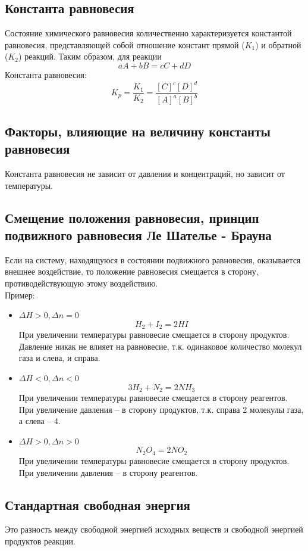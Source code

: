 \documentclass[14pt,a4paper]{scrartcl}
\begin{document}
\subsection*{Константа равновесия}
Состояние химического равновесия количественно характеризуется константой равновесия, представляющей собой отношение констант прямой ($K_1$) и обратной ($K_2$) реакций. Таким образом, для реакции
$$ aA + bB = cC +  dD $$
Константа равновесия:
$$ K_p = \frac{K_1}{K_2} = \dfrac{\left[ C\right]^c \left[ D\right]^d }{\left[ A\right]^a \left[ B\right]^b} $$
\subsection*{Факторы, влияющие на величину константы равновесия}
Константа равновесия не зависит от давления и концентраций, но зависит от температуры.
\subsection*{Смещение положения равновесия, принцип подвижного равновесия Ле Шателье - Брауна}
Если на систему, находящуюся в состоянии подвижного равновесия, оказывается внешнее воздействие, то положение равновесия смещается в сторону, противодействующую этому воздействию. \\
Пример: \\
\begin{itemize}
	\item $ \Delta{H} > 0, \Delta{n} = 0 $ 
	$$ H_2 + I_2 = 2HI $$
	При увеличении температуры равновесие смещается в сторону продуктов. \\
	Давление никак не влияет на равновесие, т.к. одинаковое количество молекул газа и слева, и справа.
	\item $ \Delta{H} < 0, \Delta{n} < 0 $
	$$ 3H_2 + N_2 = 2 NH_3  $$
	При увеличении температуры равновесие смещается в сторону реагентов. \\
	При увеличение давления -- в сторону продуктов, т.к. справа 2 молекулы газа, а слева -- 4.
	\item $ \Delta{H} > 0, \Delta{n} > 0 $
	$$ N_2O_4 = 2NO_2 $$
	При увеличении температуры равновесие смещается в сторону продуктов. \\
	При увеличении давления -- в сторону реагентов.  	
\end{itemize}

\subsection*{Стандартная свободная энергия}
Это разность между свободной энергией исходных веществ и свободной энергией продуктов реакции.
\end{document}
